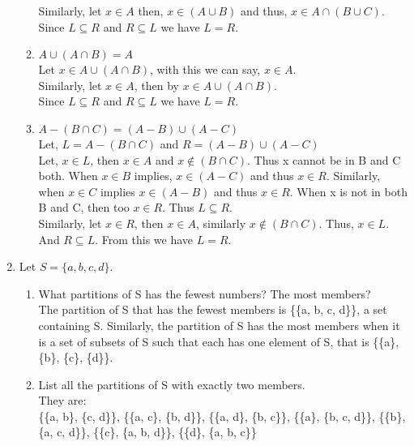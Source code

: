 \documentclass[a4paper,12pt]{article}
\begin{document}
\begin{enumerate}
\begin{enumerate}
            Similarly, let $x \in A$ then, $x \in (A \cup B)$ and thus, $x \in A\cap (B \cup C)$.\\
            Since $L \subseteq R$ and $R \subseteq L$ we have $L = R$.
        \item
            $A \cup (A \cap B) = A$ \\
            Let $x \in A \cup (A \cap B)$, with this we can say, $x \in A$. \\
            Similarly, let $x \in A$, then by $x \in A \cup (A \cap B) $. \\
            Since $L \subseteq R$ and $R \subseteq L$ we have $L = R$.
            \pagebreak
        \item
            $A - (B \cap C) = (A - B)\cup (A - C)$\\
            Let, $L = A -(B \cap C)$ and $R = (A - B) \cup (A - C)$\\ 
            Let, $x \in L$, then $x \in A$ and $x \not\in (B \cap C)$. Thus x cannot be in B and C both.
            When $x \in B$ implies, $x \in (A - C)$ and thus $x \in R$. Similarly, when $x \in C$ implies $ x \in (A - B)$ and thus $x \in R$.
            When x is not in both B and C, then too $x \in R$. Thus $L \subseteq R$.\\
            Similarly, let $x \in R$, then $x \in A$, similarly $x \not\in (B \cap C)$. Thus, $x \in L$. And $R \subseteq L$.
            From this we have $L = R$.
    \end{enumerate}
\item
            Let $S = \{a, b, c, d\}.$
            \begin{enumerate}
                \item
                    What partitions of S has the fewest numbers? The most members? \\
                    The partition of S that has the fewest members is \{\{a, b, c, d\}\}, a set containing S. Similarly, the partition of S has the most members when it is a set of subsets of S such that each has one element of S, that is \{\{a\}, \{b\}, \{c\}, \{d\}\}.
                \item
                    List all the partitions of S with exactly two members. \\
                    They are: \\
                        \{\{a, b\}, \{c, d\}\}, \{\{a, c\}, \{b, d\}\}, \{\{a, d\}, \{b, c\}\}, \{\{a\}, \{b, c, d\}\}, \{\{b\}, \{a, c, d\}\}, \{\{c\}, \{a, b, d\}\}, \{\{d\}, \{a, b, c\}\}
            \end{enumerate}
\end{enumerate}
\end{document}
